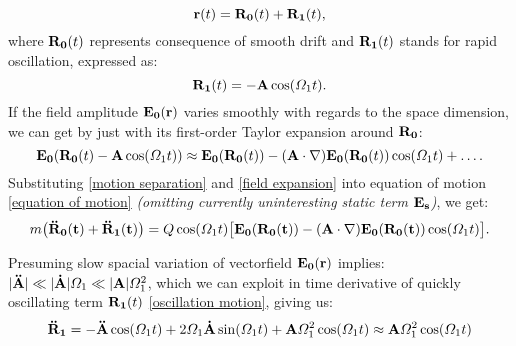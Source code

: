\begin{equation}
	\label{motion separation}
	\vb{r}(t) = \vb{R_0}(t) + \vb{R_1}(t),
\end{equation}
where $\vb{R_0}(t)$ represents consequence of smooth drift and $\vb{R_1}(t)$ stands for rapid oscillation, expressed as:
\begin{equation}
	\label{oscillation motion}
	\vb{R_1}(t) = - \vb{A} \cos(\Omega_1 t).
\end{equation}
If the field amplitude $\vb{E_0}(\vb{r})$
 varies smoothly with regards to the space dimension, we can get by just with its first-order Taylor expansion around $\vb{R_0}$:
\begin{equation}
	\label{field expansion}
	\vb{E_0}(\vb{R_0}(t) - \vb{A} \cos(\Omega_1 t)) \approx \vb{E_0}(\vb{R_0}(t)) -(\vb{A} \cdot \nabla) \vb{E_0}(\vb{R_0}(t)) \cos(\Omega_1 t) + \dots.
\end{equation}
Substituting \eqref{motion separation} and \eqref{field expansion} into equation of motion \eqref{equation of motion} \textit{(omitting currently uninteresting static term $\vb{E_s}$)}, we get:
\begin{equation}
	m \big( \vb{\ddot{R}_0(t)} + \vb{\ddot{R}_1(t)} \big) = Q \cos(\Omega_1 t) \big[ \vb{E_0(\vb{R_0}(t))} - (\vb{A} \cdot \nabla) \vb{E_0(\vb{R_0}(t))} \cos(\Omega_1 t)  \big].
\end{equation}

Presuming slow spacial variation of vectorfield $\vb{E_0}(\vb{r})$ implies: \\ $|\vb{\ddot{A}}| \ll |\vb{\dot{A}}| \Omega_1 \ll |\vb{A}| \Omega_1^2$, which we can exploit in time derivative of quickly oscillating term $\vb{R_1}(t)$ \eqref{oscillation motion}, giving us:
\begin{equation}
	\vb{\ddot{R}_1} = - \vb{\ddot{A}} \cos(\Omega_1 t) + 2 \Omega_1 \vb{\dot{A}} \sin(\Omega_1 t) + \vb{A} \Omega_1^2 \cos(\Omega_1 t) \approx \vb{A} \Omega_1^2 \cos(\Omega_1 t)
\end{equation}

